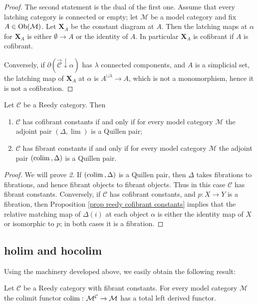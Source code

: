 \begin{proof}
The second statement is the dual of the first one. Assume that every latching category is connected or empty; let $\mathcal M$ be a model category and fix $A \in \mathrm{Ob}(\mathcal M)$. Let $\mathbf X_A$ be the constant diagram at $A$. Then the latching maps at $\alpha$ for $\mathbf X_A$ is either $\emptyset \to A$ or the identity of $A$. In particular $\mathbf X_A$ is cofibrant if $A$ is cofibrant.

Conversely, if $\partial (\overrightarrow{\mathcal C} \downarrow \alpha)$ has $\lambda$ connected components, and $A$ is a simplicial set, the latching map of $\mathbf X_A$ at $\alpha$ is $A^{\sqcup \lambda} \to A$, which is not a monomorphism, hence it is not a cofibration.
\end{proof}

\begin{cor} \label{cor reedy fibrant constants}
Let $\mathcal C$ be a Reedy category. Then
\begin{enumerate}
\item $\mathcal C$ has cofibrant constants if and only if for every model category $\mathcal M$ the adjoint pair $(\Delta, \lim)$ is a Quillen pair;
\item $\mathcal C$ has fibrant constants if and only if for every model category $\mathcal M$ the adjoint pair $(\mathrm{colim} \,, \Delta)$ is a Quillen pair.
\end{enumerate}
\end{cor}

\begin{proof}
We will prove \emph{2.} If $(\mathrm{colim} \,, \Delta)$ is a Quillen pair, then $\Delta$ takes fibrations to fibrations, and hence fibrant objects to fibrant objects. Thus in this case $\mathcal C$ has fibrant constants. Conversely, if $\mathcal C$ has cofibrant constants, and $p \colon X \to Y$ is a fibration, then Proposition \ref{prop reedy cofibrant constants} implies that the relative matching map of $\Delta(i)$ at each object $\alpha$ is either the identity map of $X$ or isomorphic to $p$; in both cases it is a fibration.
\end{proof}

\subsection{holim and hocolim}

Using the machinery developed above, we easily obtain the following result:

\begin{prop}
Let $\mathcal C$ be a Reedy category with fibrant constants. For every model category $\mathcal M$ the colimit functor $\mathrm{colim} \, \colon \mathcal M^{\mathcal C} \to \mathcal M$ has a total left derived functor.
\end{prop}

